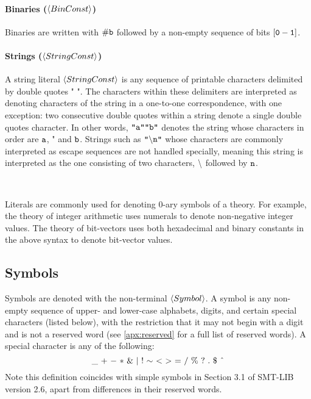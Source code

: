 \documentclass[english,a4paper,10pt]{article}
\newcommand{\mathcircumflex}[0]{\mbox{\^{}}}
\begin{document}
\paragraph{Binaries ($\left\langle BinConst\right\rangle$)}
Binaries are written with ${\tt \#b}$
followed by a non-empty sequence of bits $\left[{\tt 0}-{\tt 1}\right]$.

\paragraph{Strings ($\left\langle StringConst\right\rangle$)}
A string literal $\left\langle StringConst\right\rangle$
is any sequence of printable characters
delimited by double quotes $\texttt{"}$ $\texttt{"}$.
The characters within these delimiters
are interpreted as denoting characters of the string in a one-to-one correspondence,
with one exception:
two consecutive double quotes within a string
denote a single double quotes character.
In other words, $\texttt{"}{\tt a}\texttt{"}\texttt{"}{\tt b}\texttt{"}$ denotes the string
whose characters in order are ${\tt a}$, $\texttt{"}$ and ${\tt b}$.
Strings such as $\texttt{"}{\tt \backslash n}\texttt{"}$ whose characters are commonly
interpreted as escape sequences are not handled specially,
meaning this string is interpreted 
as the one consisting of two characters, ${\tt \backslash}$ followed by ${\tt n}$.

\ 

\noindent
Literals are commonly
used for denoting 0-ary symbols of a theory.
For example, 
the theory of integer arithmetic 
uses numerals to denote non-negative integer values.
The theory of bit-vectors uses both
hexadecimal and binary constants in the above syntax
to denote bit-vector values.

\subsection{Symbols}

Symbols are denoted with the non-terminal $\left\langle Symbol\right\rangle$. 
A symbol
is any non-empty sequence of upper- and lower-case alphabets, digits,
and certain special characters (listed below), with the restriction that it may not
begin with a digit and is not a reserved word (see \cref{apx:reserved} 
for a full list of reserved words).
A special character is any of the following:
\[
{\tt \_}\mbox{ }{\tt +}\mbox{ }{\tt -}\mbox{ }{\tt *}\mbox{ }{\tt \&}\mbox{ }{\tt |}\mbox{ }{\tt !}\mbox{ }{\tt \sim}\mbox{ }{\tt <}\mbox{ }{\tt >}\mbox{ }{\tt =}\mbox{ }{\tt /}\mbox{ }{\tt \%}\mbox{ }{\tt ?}\mbox{ }{\tt .}\mbox{ }{\tt \$}\mbox{ }{\tt \mathcircumflex}
\]
Note this definition coincides with simple
symbols in Section 3.1 of SMT-LIB version 2.6,
apart from differences in their reserved words.
\end{document}
